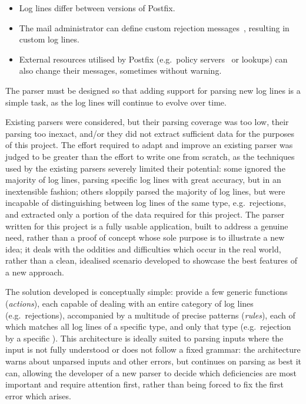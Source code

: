 \documentclass[draft]{svmult}
\begin{document}
\begin{itemize}

    \item Log lines differ between versions of Postfix.
        
    \item The mail administrator can define custom rejection
        messages~\cite{postfix-lookup-tables, smtpd_access_readme,
        smtpd_per_user_control}, resulting in custom log lines.

    \item External resources utilised by Postfix (e.g.\ policy
        servers~\cite{policy-servers} or \DNSBL{} lookups) can also change
        their messages, sometimes without warning.

\end{itemize}

The parser must be designed so that adding support for parsing new log
lines is a simple task, as the log lines will continue to evolve over time.

Existing parsers were considered, but their parsing coverage was too low,
their parsing too inexact, and/or they did not extract sufficient data for
the purposes of this project.  The effort required to adapt and improve an
existing parser was judged to be greater than the effort to write one from
scratch, as the techniques used by the existing parsers severely limited
their potential: some ignored the majority of log lines, parsing specific
log lines with great accuracy, but in an inextensible fashion; others
sloppily parsed the majority of log lines, but were incapable of
distinguishing between log lines of the same type, e.g.\ rejections, and
extracted only a portion of the data required for this project.  The parser
written for this project is a fully usable application, built to address a
genuine need, rather than a proof of concept whose sole purpose is to
illustrate a new idea; it deals with the oddities and difficulties which
occur in the real world, rather than a clean, idealised scenario developed
to showcase the best features of a new approach.

The solution developed is conceptually simple: provide a few generic
functions (\textit{actions\/}), each capable of dealing with an entire
category of log lines (e.g.\ rejections), accompanied by a multitude of
precise patterns (\textit{rules\/}), each of which matches all log lines of
a specific type, and only that type (e.g.\ rejection by a specific
\DNSBL{}).  This architecture is ideally suited to parsing inputs where the
input is not fully understood or does not follow a fixed grammar: the
architecture warns about unparsed inputs and other errors, but continues on
parsing as best it can, allowing the developer of a new parser to decide
which deficiencies are most important and require attention first, rather
than being forced to fix the first error which arises.
\end{document}
